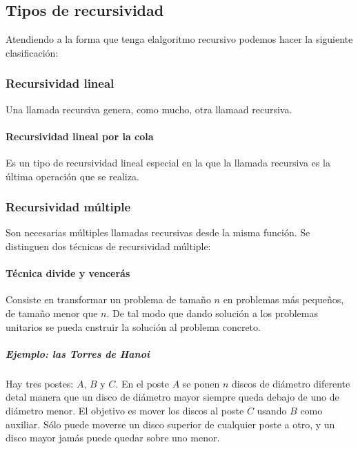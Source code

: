\documentclass[a4paper, 11pt, titlepage]{article}
\begin{document}
    \subsection{Tipos de recursividad}

        Atendiendo a la forma que tenga elalgoritmo recursivo podemos hacer la siguiente 
        clasificación:

        \subsubsection{Recursividad lineal}

            Una llamada recursiva genera, como mucho, otra llamaad recursiva.

            \paragraph{Recursividad lineal por la cola} Es un tipo de recursividad lineal especial 
            en la que la llamada recursiva es la última operación que se realiza.

        \subsubsection{Recursividad múltiple}

            Son necesarias múltiples llamadas recursivas desde la misma función. Se distinguen 
            dos técnicas de recursividad múltiple:

            \paragraph{Técnica divide y vencerás}

                Consiste en transformar un problema de tamaño $n$ en problemas más pequeños, de tamaño 
                menor que $n$. De tal modo que dando solución a los problemas unitarios se pueda 
                cnstruir la solución al problema concreto.

                \subparagraph{Ejemplo: las Torres de Hanoi}

                    Hay tres postes: $A$, $B$ y $C$. En el poste $A$ se ponen $n$ discos de diámetro 
                    diferente detal manera que un disco de diámetro mayor siempre queda debajo de uno 
                    de diámetro menor. El objetivo es mover los discos al poste $C$ usando $B$ como
                    auxiliar. Sólo puede moverse un disco superior de cualquier poste a otro, y un disco 
                    mayor jamás puede quedar sobre uno menor.
\end{document}
